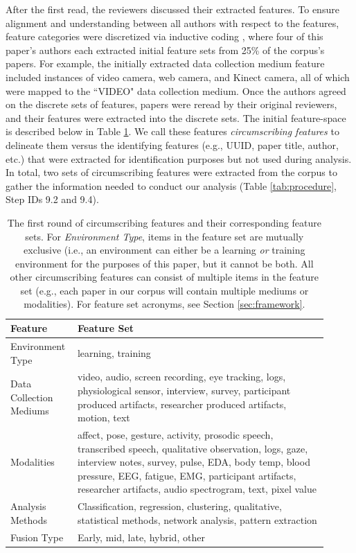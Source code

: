 \documentclass[manuscript,screen,review]{acmart}
\begin{document}
After the first read, the reviewers discussed their extracted features. To ensure alignment and understanding between all authors with respect to the features, feature categories were discretized via inductive coding \cite{thomas2003general}, where four of this paper's authors each extracted initial feature sets from 25\% of the corpus's papers. For example, the initially extracted data collection medium feature included instances of video camera, web camera, and Kinect camera, all of which were mapped to the ``VIDEO" data collection medium. Once the authors agreed on the discrete sets of features, papers were reread by their original reviewers, and their features were extracted into the discrete sets. The initial feature-space is described below in Table \ref{tab:circumscribing_features_1}. We call these features \textit{circumscribing features} to delineate them versus the identifying features (e.g., UUID, paper title, author, etc.) that were extracted for identification purposes but not used during analysis. In total, two sets of circumscribing features were extracted from the corpus to gather the information needed to conduct our analysis (Table \ref{tab:procedure}, Step IDs 9.2 and 9.4).

\begin{table}[htbp]
    \renewcommand{\arraystretch}{1.3}%
    \centering
    \begin{tabular}{p{0.16\linewidth}@{\hskip .1in} | @{\hskip .1in}p{0.75\linewidth}@{\hskip .1in}}
        \toprule
        Feature & Feature Set\\
        
        \toprule
        Environment Type & learning, training\\
        Data Collection Mediums & video, audio, screen recording, eye tracking, logs, physiological sensor, interview, survey, participant produced artifacts, researcher produced artifacts, motion, text\\
        Modalities & affect, pose, gesture, activity, prosodic speech, transcribed speech, qualitative observation, logs, gaze, interview notes, survey, pulse, EDA, body temp, blood pressure, EEG, fatigue, EMG, participant artifacts, researcher artifacts, audio spectrogram, text, pixel value\\
        Analysis Methods & Classification, regression, clustering, qualitative, statistical methods, network analysis, pattern extraction \\
        Fusion Type & Early, mid, late, hybrid, other\\

        \bottomrule
    \end{tabular}
    \caption{The first round of circumscribing features and their corresponding feature sets. For \textit{Environment Type}, items in the feature set are mutually exclusive (i.e., an environment can either be a learning \textit{or} training environment for the purposes of this paper, but it cannot be both. All other circumscribing features can consist of multiple items in the feature set (e.g., each paper in our corpus will contain multiple mediums or modalities). For feature set acronyms, see Section \ref{sec:framework}.}
    \label{tab:circumscribing_features_1}
\end{table}
\end{document}
